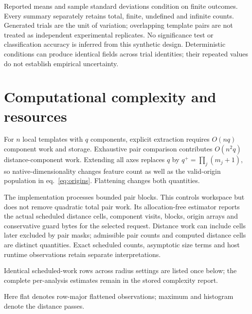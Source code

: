 \documentclass[
  english,
  11pt,
]{article}
\begin{document}
Reported means and sample standard deviations condition on finite
outcomes. Every summary separately retains total, finite, undefined and
infinite counts. Generated trials are the unit of variation; overlapping
template pairs are not treated as independent experimental replicates.
No significance test or classification accuracy is inferred from this
synthetic design. Deterministic conditions can produce identical fields
across trial identities; their repeated values do not establish
empirical uncertainty.

\section{Computational complexity and resources}\label{sec:cost}

For \(n\) local templates with \(q\) components, explicit extraction
requires \(O(nq)\) component work and storage. Exhaustive pair
comparison contributes \(O(n^2q)\) distance-component work. Extending
all axes replaces \(q\) by \(q^+=\prod_j(m_j+1)\), so
native-dimensionality changes feature count as well as the valid-origin
population in eq.~\ref{eq:origins}. Flattening changes both quantities.

The implementation processes bounded pair blocks. This controls
workspace but does not remove quadratic total pair work. Its
allocation-free estimator reports the actual scheduled distance cells,
component visits, blocks, origin arrays and conservative guard bytes for
the selected request. Distance work can include cells later excluded by
pair masks; admissible pair counts and computed distance cells are
distinct quantities. Exact scheduled counts, asymptotic size terms and
host runtime observations retain separate interpretations.

Identical scheduled-work rows across radius settings are listed once
below; the complete per-analysis estimates remain in the stored
complexity report.

Here flat denotes row-major flattened observations; maximum and
histogram denote the distance passes.

\begingroup\small\setlength{\tabcolsep}{8pt}
\end{document}
